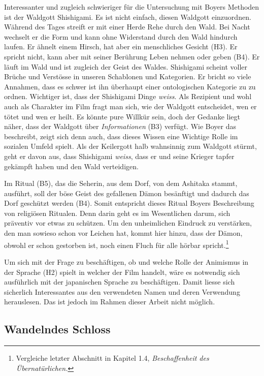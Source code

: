 Interessanter und zugleich schwieriger für die Untersuchung mit Boyers Methoden ist der Waldgott Shishigami. Es ist nicht einfach, diesen Waldgott einzuordnen. Während des Tages streift er mit einer Herde Rehe durch den Wald. Bei Nacht wechselt er die Form und kann ohne Widerstand durch den Wald hindurch laufen. Er ähnelt einem Hirsch, hat aber ein menschliches Gesicht (H3). Er spricht nicht, kann aber mit seiner Berührung Leben nehmen oder geben (B4). Er läuft im Wald und ist zugleich der Geist des Waldes. Shishigami scheint voller Brüche und Verstösse in unseren Schablonen und Kategorien. Er bricht so viele Annahmen, dass es schwer ist ihn überhaupt einer ontologischen Kategorie zu zu ordnen. Wichtiger ist, dass der Shishigami Dinge \emph{weiss}. Als Rezipient und wohl auch als Charakter im Film fragt man sich, wie der Waldgott entscheidet, wen er tötet und wen er heilt. Es könnte pure Willkür sein, doch der Gedanke liegt näher, dass der Waldgott über \emph{Informationen} (B3) verfügt. Wie Boyer das beschreibt, zeigt sich denn auch, dass dieses Wissen eine Wichtige Rolle im sozialen Umfeld spielt. Als der Keilergott halb wahnsinnig zum Waldgott stürmt, geht er davon aus, dass Shishigami \emph{weiss}, dass er und seine Krieger tapfer gekämpft haben und den Wald verteidigen. 

Im Ritual (B5), das die Seherin, aus dem Dorf, von dem Ashitaka stammt, ausführt, soll der böse Geist des gefallenen Dämon besänftigt und dadurch das Dorf geschützt werden (B4). Somit entspricht dieses Ritual Boyers Beschreibung von religiösen Ritualen. Denn darin geht es im Wesentlichen darum, sich präventiv vor etwas zu schützen. Um den unheimlichen Eindruck zu verstärken, den man sowieso schon vor Leichen hat, kommt hier hinzu, dass der Dämon, obwohl er schon gestorben ist, noch einen Fluch für alle hörbar spricht.\footnote{Vergleiche letzter Abschnitt in Kapitel 1.4, \emph{Beschaffenheit des Übernatürlichen.}}

Um sich mit der Frage zu beschäftigen, ob und welche Rolle der Animismus in der Sprache (H2) spielt in welcher der Film handelt, wäre es notwendig sich ausführlich mit der japanischen Sprache zu beschäftigen. Damit liesse sich sicherlich Interessantes aus den verwendeten Namen und deren Verwendung herauslesen. Das ist jedoch im Rahmen dieser Arbeit nicht möglich. 

\subsection{Wandelndes Schloss} 
